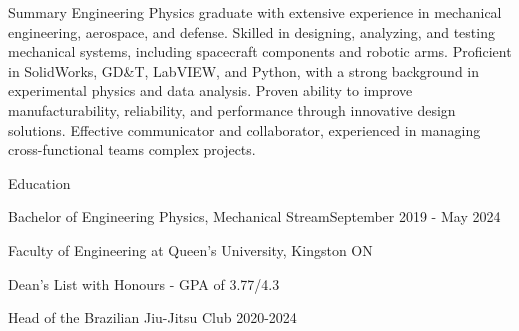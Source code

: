 \documentclass{resume} %
\begin{document}
\begin{rSection}{Summary}
Engineering Physics graduate with extensive experience in mechanical engineering, aerospace, and defense. Skilled in designing, analyzing, and testing mechanical systems, including spacecraft components and robotic arms. Proficient in SolidWorks, GD\&T, LabVIEW, and Python, with a strong background in experimental physics and data analysis. Proven ability to improve manufacturability, reliability, and performance through innovative design solutions. Effective communicator and collaborator, experienced in managing cross-functional teams complex projects.
\end{rSection}

\begin{rSection}{Education}

\begin{rSubsection}{Bachelor of Engineering Physics, Mechanical Stream}{September 2019 - May 2024}{}{}{}
  \item Faculty of Engineering at Queen's University, Kingston ON
  \item Dean's List with Honours - GPA of 3.77/4.3
  \item Head of the Brazilian Jiu-Jitsu Club 2020-2024
\end{rSubsection}

\end{rSection}

\end{document}
